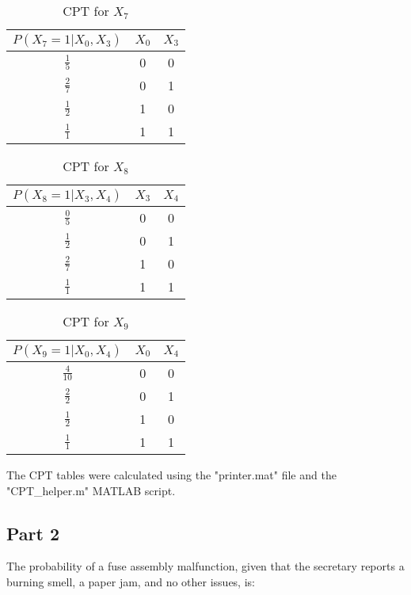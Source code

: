 \documentclass{article}
\begin{document}
\begin{table}[H]
\centering
\begin{tabular}{|c|c|c|}
\hline
$P(X_7 = 1 | X_0, X_3)$ & $X_0$ & $X_3$ \\ \hline
$\frac{1}{5}$ & 0 & 0 \\ \hline
$\frac{2}{7}$ & 0 & 1 \\ \hline
$\frac{1}{2}$ & 1 & 0 \\ \hline
$\frac{1}{1}$ & 1 & 1 \\ \hline
\end{tabular}
\caption{CPT for $X_7$}
\end{table}

\begin{table}[H]
\centering
\begin{tabular}{|c|c|c|}
\hline
$P(X_8 = 1 | X_3, X_4)$ & $X_3$ & $X_4$ \\ \hline
$\frac{0}{5}$ & 0 & 0 \\ \hline
$\frac{1}{2}$ & 0 & 1 \\ \hline
$\frac{2}{7}$ & 1 & 0 \\ \hline
$\frac{1}{1}$ & 1 & 1 \\ \hline
\end{tabular}
\caption{CPT for $X_8$}
\end{table}

\begin{table}[H]
\centering
\begin{tabular}{|c|c|c|}
\hline
$P(X_9 = 1 | X_0, X_4)$ & $X_0$ & $X_4$ \\ \hline
$\frac{4}{10}$ & 0 & 0 \\ \hline
$\frac{2}{2}$ & 0 & 1 \\ \hline
$\frac{1}{2}$ & 1 & 0 \\ \hline
$\frac{1}{1}$ & 1 & 1 \\ \hline
\end{tabular}
\caption{CPT for $X_9$}
\end{table}


The CPT tables were calculated using the "printer.mat" file and the "CPT\_helper.m" MATLAB script. 


\subsection*{Part 2}

The probability of a fuse assembly malfunction, given that the secretary reports a burning smell, a paper jam, and no other issues, is:
\end{document}
